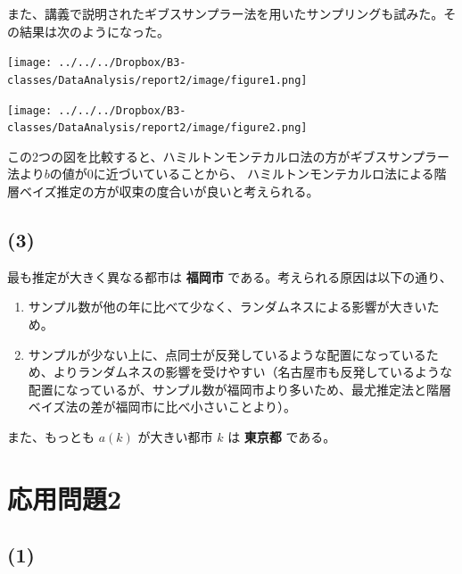 \documentclass[a4j,xelatex,ja=standard,jafont=hiragino-pron, 9pt]{bxjsarticle}
\let\origfigure=\figure
\let\endorigfigure=\endfigure
\renewenvironment{figure}[1][]{%
  \origfigure[H]
}{%
  \endorigfigure
}
\def\tightlist{\itemsep1pt\parskip0pt\parsep0pt}
\begin{document}
また、講義で説明されたギブスサンプラー法を用いたサンプリングも試みた。その結果は次のようになった。

\begin{figure}
  \centering
  \texttt{[image: ../../../Dropbox/B3-classes/DataAnalysis/report2/image/figure1.png]}
  \caption{ギブスサンプラー法と最尤推定法の比較}
\end{figure}

\begin{figure}
  \centering
  \texttt{[image: ../../../Dropbox/B3-classes/DataAnalysis/report2/image/figure2.png]}
  \caption{ギブスサンプラー法と最尤推定法の $a$ と $b$ の比較}
  \label{}
\end{figure}

この2つの図を比較すると、ハミルトンモンテカルロ法の方がギブスサンプラー法より$b$の値が0に近づいていることから、
ハミルトンモンテカルロ法による階層ベイズ推定の方が収束の度合いが良いと考えられる。

\subsection*{(3)}

最も推定が大きく異なる都市は \textbf{福岡市}
である。考えられる原因は以下の通り、

\begin{enumerate}
\def\labelenumi{\arabic{enumi}.}
\tightlist
\item
  サンプル数が他の年に比べて少なく、ランダムネスによる影響が大きいため。
\item
  サンプルが少ない上に、点同士が反発しているような配置になっているため、よりランダムネスの影響を受けやすい（名古屋市も反発しているような配置になっているが、サンプル数が福岡市より多いため、最尤推定法と階層ベイズ法の差が福岡市に比べ小さいことより）。
\end{enumerate}

また、もっとも \(a(k)\) が大きい都市 \(k\) は \textbf{東京都} である。

\section*{応用問題2}

\subsection*{(1)}
\end{document}
